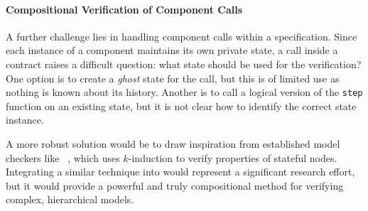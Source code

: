 \paragraph{Compositional Verification of Component Calls}
A further challenge lies in handling component calls within a specification. Since each instance of
a component maintains its own private state, a call inside a contract raises a difficult question:
what state should be used for the verification? One option is to create a \emph{ghost} state for the
call, but this is of limited use as nothing is known about its history. Another is to call a logical
version of the \texttt{step} function on an existing state, but it is not clear how to identify the
correct state instance.

A more robust solution would be to draw inspiration from established model checkers like
\Kind~\cite{DBLP:conf/cav/ChampionMST16}, which uses $k$-induction to verify properties of stateful
\Lustre nodes. Integrating a similar technique into \Creusot would represent a significant research
effort, but it would provide a powerful and truly compositional method for verifying complex,
hierarchical \GRust models.
